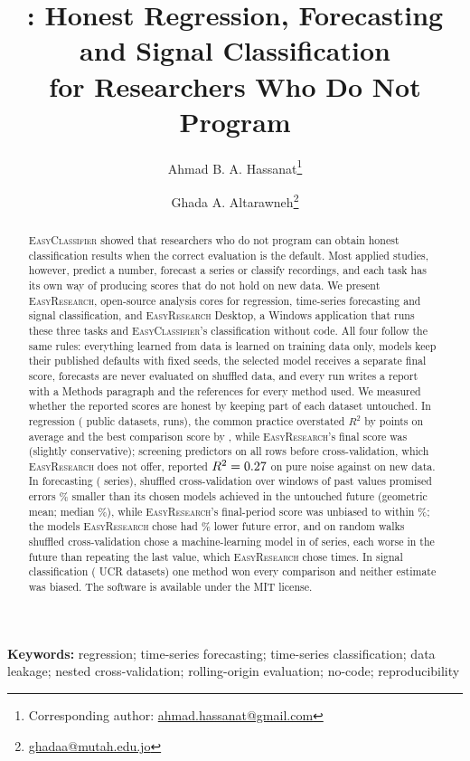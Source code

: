 \documentclass[11pt,a4paper]{article}
\title{\ER: Honest Regression, Forecasting and Signal Classification\\ for Researchers Who Do Not Program}
\author[1]{Ahmad B. A. Hassanat\thanks{Corresponding author: \href{mailto:ahmad.hassanat@gmail.com}{ahmad.hassanat@gmail.com}}}
\author[2]{Ghada A. Altarawneh\thanks{\href{mailto:ghadaa@mutah.edu.jo}{ghadaa@mutah.edu.jo}}}
\affil[1]{Faculty of Information Technology, Mutah University, Karak, Jordan}
\affil[2]{Department of Accounting, Mutah University, Karak, Jordan}
\date{}
\newcommand{\ER}{\textsc{EasyResearch}}
\newcommand{\EC}{\textsc{EasyClassifier}}
\begin{document}
\maketitle

\begin{abstract}
\EC{} showed that researchers who do not program can obtain honest classification results when the correct evaluation is the default. Most applied studies, however, predict a number, forecast a series or classify recordings, and each task has its own way of producing scores that do not hold on new data. We present \ER, open-source analysis cores for regression, time-series forecasting and signal classification, and \ER{} Desktop, a Windows application that runs these three tasks and \EC's classification without code. All four follow the same rules: everything learned from data is learned on training data only, models keep their published defaults with fixed seeds, the selected model receives a separate final score, forecasts are never evaluated on shuffled data, and every run writes a report with a Methods paragraph and the references for every method used. We measured whether the reported scores are honest by keeping part of each dataset untouched. In regression (\RegNData{} public datasets, \RegRuns{} runs), the common practice overstated $R^2$ by \RegBiasNaive{} points on average and the best comparison score by \RegBiasComp, while \ER's final score was \RegBiasFinal{} (slightly conservative); screening predictors on all rows before cross-validation, which \ER{} does not offer, reported $R^2 = 0.27$ on pure noise against \ScrExt{} on new data. In forecasting (\FcNData{} series), shuffled cross-validation over windows of past values promised errors \FcShufGeo\% smaller than its chosen models achieved in the untouched future (geometric mean; median \FcShufMedian\%), while \ER's final-period score was unbiased to within \FcFinalGeo\%; the models \ER{} chose had \FcTruthGain\% lower future error, and on random walks shuffled cross-validation chose a machine-learning model in \FcRWShufML{} of \FcRWn{} series, each worse in the future than repeating the last value, which \ER{} chose \FcRWToolNaive{} times. In signal classification (\SigNData{} UCR datasets) one method won every comparison and neither estimate was biased. The software is available under the MIT license.
\end{abstract}

\noindent\textbf{Keywords:} regression; time-series forecasting; time-series classification; data leakage; nested cross-validation; rolling-origin evaluation; no-code; reproducibility
\end{document}
